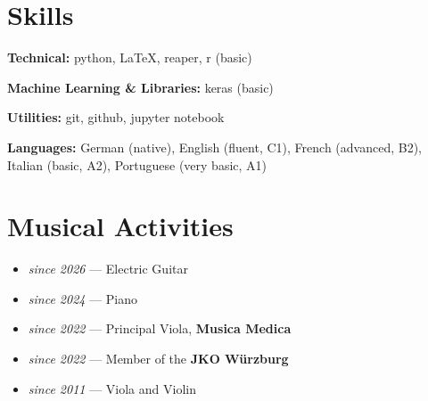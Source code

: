 \documentclass[11pt,a4paper]{article}
\begin{document}
\section{Skills}
\textbf{Technical:} python, \LaTeX, reaper, r (basic)

\textbf{Machine Learning \& Libraries:} keras (basic)

\textbf{Utilities:} git, github, jupyter notebook

\textbf{Languages:} German (native), English (fluent, C1), French (advanced, B2), Italian (basic, A2), Portuguese (very basic, A1)

\section*{Musical Activities}

\begin{itemize}
  \item \textit{since 2026} — Electric Guitar
  \item \textit{since 2024} — Piano
  \item \textit{since 2022} — Principal Viola, \textbf{Musica Medica}
  \item \textit{since 2022} — Member of the \textbf{JKO Würzburg}
  \item \textit{since 2011} — Viola and Violin
\end{itemize}
\end{document}

